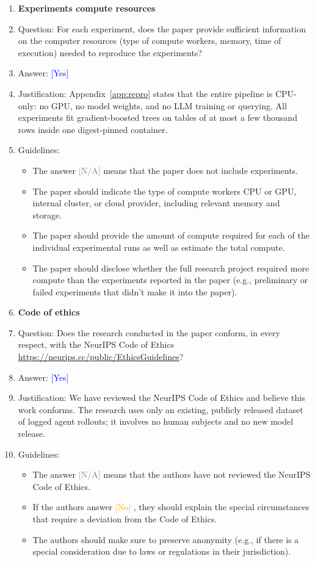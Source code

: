 \documentclass{article}
\providecommand{\answerYes}[1][]{\textcolor{blue}{[Yes] #1}}
\providecommand{\answerNo}[1][]{\textcolor{orange}{[No] #1}}
\providecommand{\answerNA}[1][]{\textcolor{gray}{[N/A] #1}}
\begin{document}
\begin{enumerate}
\item {\bf Experiments compute resources}
    \item[] Question: For each experiment, does the paper provide sufficient information on the computer resources (type of compute workers, memory, time of execution) needed to reproduce the experiments?
    \item[] Answer: \answerYes{}
    \item[] Justification: Appendix~\ref{app:repro} states that the entire pipeline is CPU-only: no GPU, no model weights, and no LLM training or querying. All experiments fit gradient-boosted trees on tables of at most a few thousand rows inside one digest-pinned container.
    \item[] Guidelines:
    \begin{itemize}
        \item The answer \answerNA{} means that the paper does not include experiments.
        \item The paper should indicate the type of compute workers CPU or GPU, internal cluster, or cloud provider, including relevant memory and storage.
        \item The paper should provide the amount of compute required for each of the individual experimental runs as well as estimate the total compute.
        \item The paper should disclose whether the full research project required more compute than the experiments reported in the paper (e.g., preliminary or failed experiments that didn't make it into the paper).
    \end{itemize}

\item {\bf Code of ethics}
    \item[] Question: Does the research conducted in the paper conform, in every respect, with the NeurIPS Code of Ethics \url{https://neurips.cc/public/EthicsGuidelines}?
    \item[] Answer: \answerYes{}
    \item[] Justification: We have reviewed the NeurIPS Code of Ethics and believe this work conforms. The research uses only an existing, publicly released dataset of logged agent rollouts; it involves no human subjects and no new model release.
    \item[] Guidelines:
    \begin{itemize}
        \item The answer \answerNA{} means that the authors have not reviewed the NeurIPS Code of Ethics.
        \item If the authors answer \answerNo, they should explain the special circumstances that require a deviation from the Code of Ethics.
        \item The authors should make sure to preserve anonymity (e.g., if there is a special consideration due to laws or regulations in their jurisdiction).
    \end{itemize}


\end{enumerate}
\end{document}
